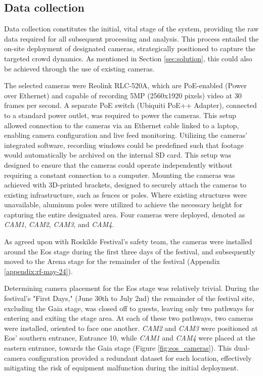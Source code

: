 \subsection{Data collection}
\label{sec:data_collection}

Data collection constitutes the initial, vital stage of the system, providing the raw data required for all subsequent processing and analysis. This process entailed the on-site deployment of designated cameras, strategically positioned to capture the targeted crowd dynamics. As mentioned in Section \ref{sec:solution}, this could also be achieved through the use of existing cameras.

The selected cameras were Reolink RLC-520A, which are PoE-enabled (Power over Ethernet) and capable of recording 5MP (2560x1920 pixels) video at 30 frames per second. A separate PoE switch (Ubiquiti PoE++ Adapter), connected to a standard power outlet, was required to power the cameras. This setup allowed connection to the cameras via an Ethernet cable linked to a laptop, enabling camera configuration and live feed monitoring. Utilizing the cameras' integrated software, recording windows could be predefined such that footage would automatically be archived on the internal SD card. This setup was designed to ensure that the cameras could operate independently without requiring a constant connection to a computer. Mounting the cameras was achieved with 3D-printed brackets, designed to securely attach the cameras to existing infrastructure, such as fences or poles. Where existing structures were unavailable, aluminum poles were utilized to achieve the necessary height for capturing the entire designated area. Four cameras were deployed, denoted as \textit{CAM1}, \textit{CAM2}, \textit{CAM3}, and \textit{CAM4}.

As agreed upon with Roskilde Festival's safety team, the cameras were installed around the Eos stage during the first three days of the festival, and subsequently moved to the Arena stage for the remainder of the festival (Appendix \ref{appendix:rf-may-24}).

Determining camera placement for the Eos stage was relatively trivial. During the festival's "First Days," (June 30th to July 2nd) the remainder of the festival site, excluding the Gaia stage, was closed off to guests, leaving only two pathways for entering and exiting the stage area. At each of these two pathways, two cameras were installed, oriented to face one another. \textit{CAM2} and \textit{CAM3} were positioned at Eos' southern entrance, Entrance 10, while \textit{CAM1} and \textit{CAM4} were placed at the eastern entrance, towards the Gaia stage (Figure \ref{fig:eos_cameras}). This dual-camera configuration provided a redundant dataset for each location, effectively mitigating the risk of equipment malfunction during the initial deployment.

